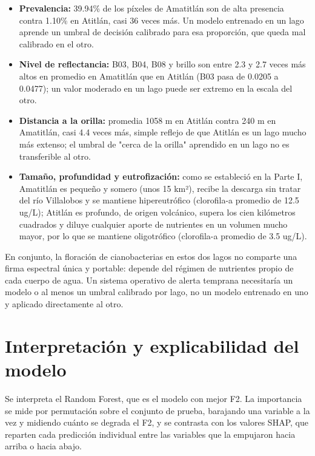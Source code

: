 \documentclass[10pt,a4paper]{article}
\begin{document}
\begin{itemize}
  \item \textbf{Prevalencia:} 39.94\% de los píxeles de Amatitlán son de alta presencia contra 1.10\% en Atitlán,
  casi 36 veces más. Un modelo entrenado en un lago aprende un umbral de decisión calibrado para esa proporción, que
  queda mal calibrado en el otro.
  \item \textbf{Nivel de reflectancia:} B03, B04, B08 y brillo son entre 2.3 y 2.7 veces más altos en promedio en
  Amatitlán que en Atitlán (B03 pasa de 0.0205 a 0.0477); un valor moderado en un lago puede ser extremo en la
  escala del otro.
  \item \textbf{Distancia a la orilla:} promedia 1058 m en Atitlán contra 240 m en Amatitlán, casi 4.4 veces más,
  simple reflejo de que Atitlán es un lago mucho más extenso; el umbral de "cerca de la orilla" aprendido en un lago
  no es transferible al otro.
  \item \textbf{Tamaño, profundidad y eutrofización:} como se estableció en la Parte I, Amatitlán es pequeño y
  somero (unos 15 km²), recibe la descarga sin tratar del río Villalobos y se mantiene hipereutrófico (clorofila-a
  promedio de 12.5 ug/L); Atitlán es profundo, de origen volcánico, supera los cien kilómetros cuadrados y diluye
  cualquier aporte de nutrientes en un volumen mucho mayor, por lo que se mantiene oligotrófico (clorofila-a
  promedio de 3.5 ug/L).
\end{itemize}

En conjunto, la floración de cianobacterias en estos dos lagos no comparte una firma espectral única y portable:
depende del régimen de nutrientes propio de cada cuerpo de agua. Un sistema operativo de alerta temprana necesitaría
un modelo o al menos un umbral calibrado por lago, no un modelo entrenado en uno y aplicado directamente al otro.

\section{Interpretación y explicabilidad del modelo}

Se interpreta el Random Forest, que es el modelo con mejor F2. La importancia se mide por permutación sobre el
conjunto de prueba, barajando una variable a la vez y midiendo cuánto se degrada el F2, y se contrasta con los
valores SHAP, que reparten cada predicción individual entre las variables que la empujaron hacia arriba o hacia
abajo.
\end{document}
